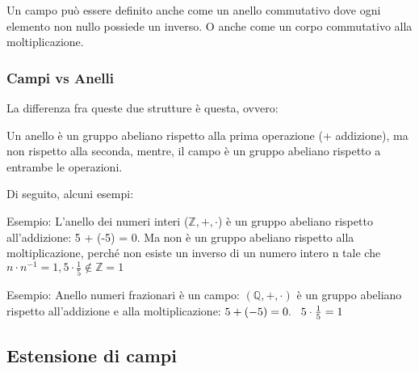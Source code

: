 \textsf{\small Un campo può essere definito anche come un anello commutativo dove ogni elemento non nullo possiede un inverso.}
\textsf{\small O anche come un corpo commutativo alla moltiplicazione.}

\subsubsection{Campi vs Anelli} %

\textsf{\small La differenza fra queste due strutture è questa, ovvero:}

\textsf{\small Un anello è un gruppo abeliano rispetto alla prima operazione (+ addizione), ma non rispetto alla seconda, mentre, il campo è un gruppo abeliano rispetto a entrambe le operazioni.}

\textsf{\small Di seguito, alcuni esempi:}

\textsf{\small Esempio: L'anello dei numeri interi ($\mathbb{Z}, +, \cdot$) è un gruppo abeliano rispetto all'addizione: 5 + (-5) = 0. Ma non è un gruppo abeliano rispetto alla moltiplicazione, perché non esiste un inverso di un numero intero n tale che $n \cdot n^{-1} = 1, 5 \cdot \frac{1}{5} \underset{}{\notin \mathbb{Z}} = 1$}


\textsf{\small Esempio: Anello numeri frazionari è un campo: $(\mathbb{Q}, +, \cdot)$ è un gruppo abeliano rispetto all'addizione e alla moltiplicazione: $5 + (-5) = 0. \hspace{.3cm} 5 \cdot \frac{1}{5} = 1$}


\subsection{Estensione di campi}

